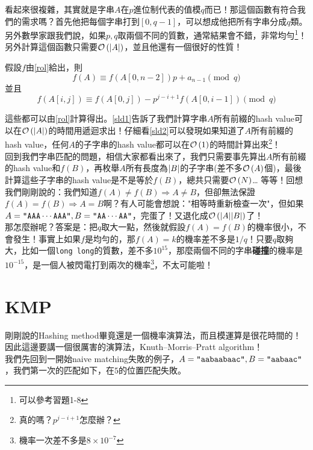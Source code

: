 \documentclass[a4paper,12pt]{book}
\begin{document}
看起來很複雜，其實就是字串$A$在$p$進位制代表的值模$q$而已！那這個函數有符合我們的需求嗎？首先他把每個字串打到$[0, q-1]$，可以想成他把所有字串分成$q$類。另外數學家跟我們說，如果$p,q$取兩個不同的質數，通常結果會不錯，非常均勻\footnote{可以參考習題1-8}！另外計算這個函數只需要$\operatorname{\mathcal{O}}\left(|A|\right)$，並且他還有一個很好的性質！
\begin{theorem}
  假設$f$由\eqref{rol}給出，則
  \begin{equation}
    \label{sld1}
    f(A) \equiv f(A[0, n-2]) p + a_{n-1} \pmod{q}
  \end{equation}
  並且
  \begin{equation}
    \label{sld2}
    f(A[i, j]) \equiv f(A[0, j]) - p^{j-i+1} f(A[0, i-1]) \pmod{q}
  \end{equation}
\end{theorem}
這些都可以由\eqref{rol}計算得出。\eqref{sld1}告訴了我們計算字串$A$所有前綴的hash value可以在$\operatorname{\mathcal{O}}\left(\lvert A \rvert\right)$的時間用遞迴求出！仔細看\eqref{sld2}可以發現如果知道了$A$所有前綴的hash value，任何$A$的子字串的hash value都可以在$\operatorname{\mathcal{O}}\left(1\right)$的時間計算出來\footnote{真的嗎？$p^{j-i+1}$怎麼辦？}！ \\
回到我們字串匹配的問題，相信大家都看出來了，我們只需要事先算出$A$所有前綴的hash value和$f(B)$，再枚舉$A$所有長度為$\lvert B \rvert$的子字串(差不多$\operatorname{\mathcal{O}}\left(A\right)$個)，最後計算這些子字串的hash value是不是等於$f(B)$，總共只需要$\operatorname{\mathcal{O}}\left(N\right)$…
等等！回想我們剛剛說的：我們知道$f(A) \neq f(B) \Rightarrow A \neq B$，但卻無法保證$f(A) = f(B) \Rightarrow A = B$啊？有人可能會想說："相等時重新檢查一次"，但如果$A = \texttt{"AAA}\cdots\texttt{AAA"}, B = \texttt{"AA}\cdots\texttt{AA"}$，完蛋了！又退化成$\operatorname{\mathcal{O}}\left(\lvert A \rvert \lvert B \rvert\right)$了！ \\
那怎麼辦呢？答案是：把$q$取大一點，然後就假設$f(A) = f(B)$的機率很小，不會發生！事實上如果$f$是均勻的，那$f(A) = k$的機率差不多是$1/q$！只要$q$取夠大，比如一個\texttt{long long}的質數，差不多$10^{15}$，那麼兩個不同的字串{\bf 碰撞}的機率是$10^{-15}$，是一個人被閃電打到兩次的機率\footnote{機率一次差不多是$8 \times 10^{-7}$}，不太可能啦！

\section{KMP}
剛剛說的Hashing method畢竟還是一個機率演算法，而且模運算是很花時間的！因此這邊要講一個很厲害的演算法，Knuth–Morris–Pratt algorithm！ \\
我們先回到一開始naive matching失敗的例子，$A = \texttt{"aabaabaac"}, B = \texttt{"aabaac"}$，我們第一次的匹配如下，在$5$的位置匹配失敗。
\end{document}
